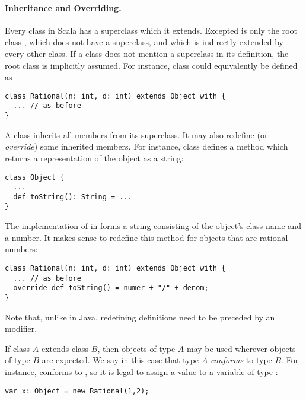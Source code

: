 \documentclass[11pt]{book}
\begin{document}
\paragraph{Inheritance and Overriding.}
Every class in Scala has a superclass which it extends.
Excepted is only the root class \verb@Object@, which does not have a
superclass, and which is indirectly extended by every other class.
If a class does not mention a superclass in its definition, the root
class \verb@Object@ is implicitly assumed. For instance, class
\verb@Rational@ could equivalently be defined as
\begin{verbatim}
class Rational(n: int, d: int) extends Object with {
  ... // as before
}
\end{verbatim}
A class inherits all members from its superclass. It may also redefine
(or: {\em override}) some inherited members. For instance, class
\verb@Object@ defines
a method
\verb@toString@ which returns a representation of the object as a string:
\begin{verbatim}
class Object {
  ...
  def toString(): String = ...
}
\end{verbatim}
The implementation of \verb@toString@ in \verb@Object@
forms a string consisting of the object's class name and a number. It
makes sense to redefine this method for objects that are rational
numbers:
\begin{verbatim}
class Rational(n: int, d: int) extends Object with {
  ... // as before
  override def toString() = numer + "/" + denom;
}
\end{verbatim}
Note that, unlike in Java, redefining definitions need to be preceded
by an \verb@override@ modifier.

If class $A$ extends class $B$, then objects of type $A$ may be used
wherever objects of type $B$ are expected. We say in this case that
type $A$ {\em conforms} to type $B$.  For instance, \verb@Rational@
conforms to \verb@Object@, so it is legal to assign a \verb@Rational@
value to a variable of type \verb@Object@:
\begin{verbatim}
var x: Object = new Rational(1,2);
\end{verbatim}
\end{document}
